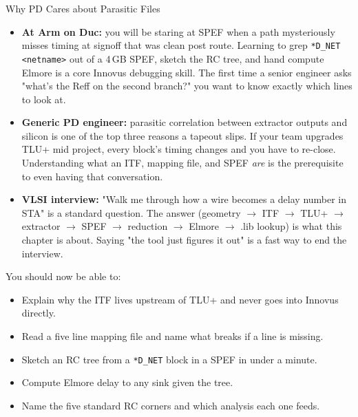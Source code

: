 \begin{pdnote}{Why PD Cares about Parasitic Files}
\begin{itemize}
  \item \textbf{At Arm on Duc:} you will be staring at SPEF when a path mysteriously misses timing at signoff that was clean post route. Learning to grep \texttt{*D\_NET <netname>} out of a 4\,GB SPEF, sketch the RC tree, and hand compute Elmore is a core Innovus debugging skill. The first time a senior engineer asks "what's the Reff on the second branch?" you want to know exactly which lines to look at.
  \item \textbf{Generic PD engineer:} parasitic correlation between extractor outputs and silicon is one of the top three reasons a tapeout slips. If your team upgrades TLU+ mid project, every block's timing changes and you have to re-close. Understanding what an ITF, mapping file, and SPEF \emph{are} is the prerequisite to even having that conversation.
  \item \textbf{VLSI interview:} "Walk me through how a wire becomes a delay number in STA" is a standard question. The answer (geometry $\to$ ITF $\to$ TLU+ $\to$ extractor $\to$ SPEF $\to$ reduction $\to$ Elmore $\to$ .lib lookup) is what this chapter is about. Saying "the tool just figures it out" is a fast way to end the interview.
\end{itemize}
\end{pdnote}

\begin{checkpoint}

You should now be able to:
\begin{itemize}
  \item Explain why the ITF lives upstream of TLU+ and never goes into Innovus directly.
  \item Read a five line mapping file and name what breaks if a line is missing.
  \item Sketch an RC tree from a \texttt{*D\_NET} block in a SPEF in under a minute.
  \item Compute Elmore delay to any sink given the tree.
  \item Name the five standard RC corners and which analysis each one feeds.
\end{itemize}
\end{checkpoint}
